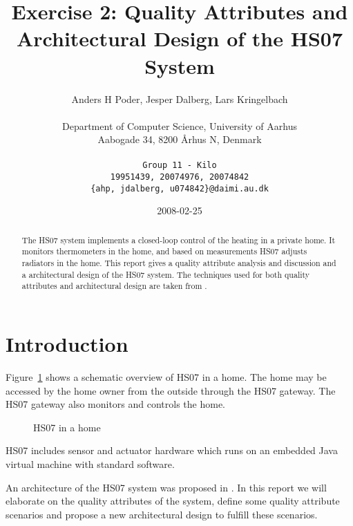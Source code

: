 \documentclass[a4paper,10pt]{article}
\begin{document}
\title{Exercise 2: Quality Attributes and Architectural Design of the HS07 System}

\author{
  Anders H Poder, Jesper Dalberg, Lars Kringelbach\\\\
  Department of Computer Science, University of Aarhus\\
  Aabogade 34, 8200 {\AA}rhus N, Denmark\\\\
  \makeatletter
  \texttt{Group 11 - Kilo}\\
  \texttt{19951439, 20074976, 20074842}\\
  \texttt{\{ahp, jdalberg, u074842\}@daimi.au.dk}
}

\date{2008-02-25}

\maketitle

\begin{abstract}
  The HS07 system implements a closed-loop control of the heating in a
  private home. It monitors thermometers in the home, and based on
  measurements HS07 adjusts radiators in the home. This report gives a
  quality attribute analysis and discussion and a architectural design of 
  the HS07 system. The techniques used for both quality attributes and 
  architectural design are taken from \cite{bass2003sa}.
\end{abstract}

\section{Introduction}

Figure~\ref{fig:hs07} shows a schematic overview of HS07 in a
home. The home may be accessed by the home owner from the outside
through the HS07 gateway. The HS07 gateway also monitors and controls
the home.
\begin{figure}[!htb]
\centerline{}
\caption{HS07 in a home}
\label{fig:hs07}
\end{figure}

HS07 includes sensor and actuator hardware which runs on an embedded Java virtual
machine with standard software.

An architecture of the HS07 system was proposed in \cite{SAiP1H1}. In this
report we will elaborate on the quality attributes of the system, define some
quality attribute scenarios and propose a new architectural design to fulfill
these scenarios.
\end{document}
